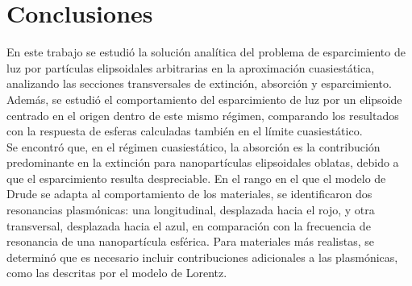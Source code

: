 \hypertarget{conclusiones}{\section{Conclusiones}}

En este trabajo se estudió la solución analítica del problema de esparcimiento de luz por partículas elipsoidales arbitrarias en la aproximación cuasiestática, analizando las secciones transversales de extinción, absorción y esparcimiento. Además, se estudió el comportamiento del esparcimiento de luz por un elipsoide centrado en el origen dentro de este mismo régimen, comparando los resultados con la respuesta de esferas calculadas también en el límite cuasiestático.\\

Se encontró que, en el régimen cuasiestático, la absorción es la contribución predominante en la extinción para nanopartículas elipsoidales oblatas, debido a que el esparcimiento resulta despreciable. En el rango en el que el modelo de Drude se adapta al comportamiento de los materiales, se identificaron dos resonancias plasmónicas: una longitudinal, desplazada hacia el rojo, y otra transversal, desplazada hacia el azul, en comparación con la frecuencia de resonancia de una nanopartícula esférica. Para materiales más realistas, se determinó que es necesario incluir contribuciones adicionales a las plasmónicas, como las descritas por el modelo de Lorentz.

